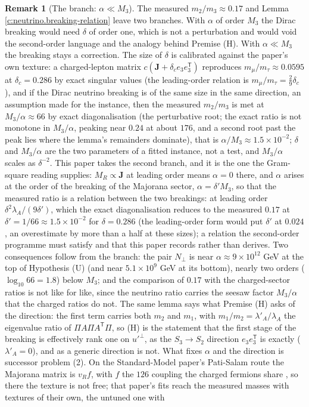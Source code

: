 \documentclass[11pt]{article}
\theoremstyle{definition}
\newtheorem{remark}[theorem]{Remark}
\theoremstyle{plain}
\providecommand{\J}{}\renewcommand{\J}{\mathbf{J}}
\begin{document}
\begin{remark}[The branch: $\alpha \ll M_{3}$]\label{c:note.neutrino.branch-m-3}
The measured $m_{2}/m_{3} \approx 0.17$ and Lemma \ref{c:neutrino.breaking-relation} leave two branches. With $\alpha$ of order $M_{3}$ the Dirac breaking would need $\delta$ of order one, which is not a perturbation and would void the second-order language and the analogy behind Premise (H). With $\alpha \ll M_{3}$ the breaking stays a correction. The size of $\delta$ is calibrated against the paper's own texture: a charged-lepton matrix $c(\J + \delta_{c}e_{3}e_{3}^{\mathsf{T}})$ reproduces $m_{\mu}/m_{\tau} \approx 0.0595$ \cite{PDG2024} at $\delta_{c} = 0.286$ by exact singular values (the leading-order relation is $m_{\mu}/m_{\tau} = \tfrac29\delta_{c}$), and if the Dirac neutrino breaking is of the same size in the same direction, an assumption made for the instance, then the measured $m_{2}/m_{3}$ is met at $M_{3}/\alpha \approx 66$ by exact diagonalisation (the perturbative root; the exact ratio is not monotone in $M_{3}/\alpha$, peaking near $0.24$ at about $176$, and a second root past the peak lies where the lemma's remainders dominate), that is $\alpha/M_{3} \approx 1.5 \times 10^{-2}$; $\delta$ and $M_{3}/\alpha$ are the two parameters of a fitted instance, not a test, and $M_{3}/\alpha$ scales as $\delta^{-2}$. This paper takes the second branch, and it is the one the Gram-square reading supplies: $M_{R} \propto \J$ at leading order means $\alpha = 0$ there, and $\alpha$ arises at the order of the breaking of the Majorana sector, $\alpha = \delta' M_{3}$, so that the measured ratio is a relation between the two breakings: at leading order $\delta^{2}\lambda_{A}/(9\delta')$, which the exact diagonalisation reduces to the measured $0.17$ at $\delta' = 1/66 \approx 1.5 \times 10^{-2}$ for $\delta = 0.286$ (the leading-order form would put $\delta'$ at $0.024$, an overestimate by more than a half at these sizes); a relation the second-order programme must satisfy and that this paper records rather than derives. Two consequences follow from the branch: the pair $N_{\perp}$ is near $\alpha \approx 9 \times 10^{12}$ GeV at the top of Hypothesis (U) (and near $5.1 \times 10^{9}$ GeV at its bottom), nearly two orders ($\log_{10}66 = 1.8$) below $M_{3}$; and the comparison of $0.17$ with the charged-sector ratios is not like for like, since the neutrino ratio carries the seesaw factor $M_{3}/\alpha$ that the charged ratios do not. The same lemma says what Premise (H) asks of the direction: the first term carries both $m_{2}$ and $m_{1}$, with $m_{1}/m_{2} = \lambda'_{A}/\lambda_{A}$ the eigenvalue ratio of $\Pi A\Pi A^{\mathsf{T}}\Pi$, so (H) is the statement that the first stage of the breaking is effectively rank one on $u'^{\perp}$, as the $S_{3} \to S_{2}$ direction $e_{3}e_{3}^{\mathsf{T}}$ is exactly ($\lambda'_{A} = 0$), and as a generic direction is not. What fixes $\alpha$ and the direction is successor problem (2). On the Standard-Model paper's Pati-Salam route the Majorana matrix is $v_{R}f$, with $f$ the $126$ coupling the charged fermions share \cite[Fact~11.1, Prop.~11.5]{ButlerT12}, so there the texture is not free; that paper's fits reach the measured masses with textures of their own, the untuned one with 
\end{remark}
\end{document}
